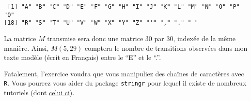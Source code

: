 \documentclass[]{article}
\begin{document}
\begin{verbatim}
 [1] "A" "B" "C" "D" "E" "F" "G" "H" "I" "J" "K" "L" "M" "N" "O" "P" "Q"
[18] "R" "S" "T" "U" "V" "W" "X" "Y" "Z" "'" "," "." " "
\end{verbatim}

La matrice \(M\) transmise sera donc une matrice 30 par 30, indexée de
la même manière. Ainsi, \(M(5, 29)\) comptera le nombre de transitions
observées dans mon texte modèle (écrit en Français) entre le ``E'' et le
``.''.

Fatalement, l'exercice voudra que vous manipuliez des chaînes de
caractères avec \texttt{R}. Vous pourrez vous aider du package
\texttt{stringr} pour lequel il existe de nombreux tutoriels (dont
\href{https://cran.r-project.org/web/packages/stringr/vignettes/stringr.html}{celui
ci}).
\end{document}
